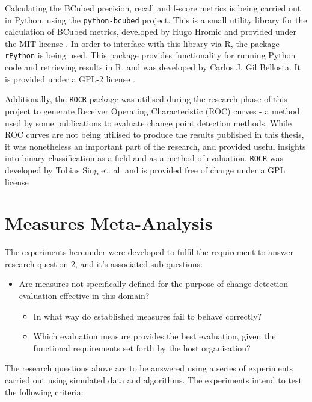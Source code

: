 \documentclass[../main.tex]{subfiles}
\begin{document}
Calculating the BCubed precision, recall and f-score metrics is being carried out in Python, using the \texttt{python-bcubed} project. This is a small utility library for the calculation of BCubed metrics, developed by Hugo Hromic and provided under the MIT license \cite{Hromic2016}. In order to interface with this library via \textsf{R}, the package \texttt{rPython} is being used. This package provides functionality for running Python code and retrieving results in \textsf{R}, and was developed by Carlos J. Gil Bellosta. It is provided under a GPL-2 license \cite{Bellosta2015}.

Additionally, the \texttt{ROCR} package was utilised during the research phase of this project to generate Receiver Operating Characteristic (ROC) curves - a method used by some publications to evaluate change point detection methods. While ROC curves are not being utilised to produce the results published in this thesis, it was nonetheless an important part of the research, and provided useful insights into binary classification as a field and as a method of evaluation. \texttt{ROCR} was developed by Tobias Sing et. al. and is provided free of charge under a GPL license \cite{Sing2005}

\section{Measures Meta-Analysis}
\label{meta analysis explainer}

The experiments hereunder were developed to fulfil the requirement to answer research question 2, and it's associated sub-questions:

\begin{itemize}
    \item Are measures not specifically defined for the purpose of change detection evaluation effective in this domain?
    \begin{itemize}
        \item In what way do established measures fail to behave correctly?
        \item Which evaluation measure provides the best evaluation, given the functional requirements set forth by the host organisation?
    \end{itemize}
\end{itemize}

The research questions above are to be answered using a series of experiments carried out using simulated data and algorithms. The experiments intend to test the following criteria:
\end{document}
